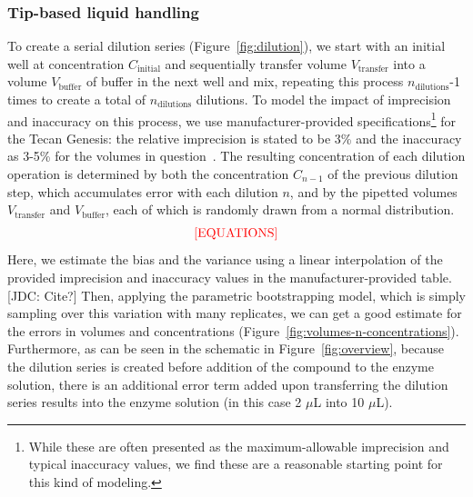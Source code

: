 \documentclass[aps,pre,twocolumn,nofootinbib,superscriptaddress,linenumbers]{revtex4-1}
\begin{document}
\subsubsection*{Tip-based liquid handling}

To create a serial dilution series (Figure~\ref{fig:dilution}), we start with an initial well at concentration $C_\mathrm{initial}$ and sequentially transfer volume $V_\mathrm{transfer}$ into a volume $V_\mathrm{buffer}$ of buffer in the next well and mix, repeating this process $n_\mathrm{dilutions}$-1 times to create a total of $n_\mathrm{dilutions}$ dilutions. 
To model the impact of imprecision and inaccuracy on this process, we use manufacturer-provided specifications\footnote{While these are often presented as the maximum-allowable imprecision and typical inaccuracy values, we find these are a reasonable starting point for this kind of modeling.} for the Tecan Genesis: the relative imprecision is stated to be 3\% and the inaccuracy as 3-5\% for the volumes in question~\cite{_tecan_2001}. 
The resulting concentration of each dilution operation is determined by both the concentration $C_{n-1}$ of the previous dilution step, which accumulates error with each dilution $n$, and by the pipetted volumes $V_\mathrm{transfer}$ and $V_\mathrm{buffer}$, each of which is randomly drawn from a normal distribution.
\begin{eqnarray}
\color{red}
\mathrm{[EQUATIONS]}
\end{eqnarray}
Here, we estimate the bias and the variance using a linear interpolation of the provided imprecision and inaccuracy values in the manufacturer-provided table. {\color{red}[JDC: Cite?]}
Then, applying the parametric bootstrapping model, which is simply sampling over this variation with many replicates, we can get a good estimate for the errors in volumes and concentrations (Figure~\ref{fig:volumes-n-concentrations}).
Furthermore, as can be seen in the schematic in Figure~\ref{fig:overview}, because the dilution series is created before addition of the compound to the enzyme solution, there is an additional error term added upon transferring the dilution series results into the enzyme solution (in this case 2 $\mu$L into 10 $\mu$L).
\end{document}
